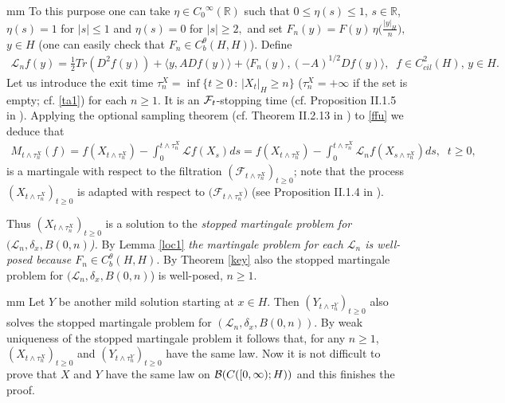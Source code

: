 \documentclass[preprint]{imsart}
\def\R{\mathbb R}
\def\L{\mathcal L}
\begin{document}
 mm 
 To this purpose one can take $\eta \in {C_0}^{\infty}(\R)$ such that $0 \le \eta(s) \le 1$, $s \in \R$,  $\eta(s)=1$ for $|s| \le 1$ and  $\eta(s) =0 $ for $|s|\ge 2,$ and set 
$
F_n(y) = F(y)\,  \eta \big(\frac{ |y|_H}{n}\big), $ $ y \in H
$ (one can easily  check that $F_n \in C_b^{\theta} (H,H) $).
Define  
$$ 
 \begin{array}{l}
\L_n f (y) = \frac{1}{2} Tr(D^2 f(y)) + \langle y, A Df(y) \rangle +
\langle F_n (y),  (-A)^{1/2} Df(y) \rangle, \;\; f \in C^2_{cil}(H), \, y \in H.
\end{array}  
$$   
Let us introduce the exit time   $\tau_n^X = \inf \{ t \ge 0 \, : \, |X_t|_H \ge n \}$ ($\tau_n^X = + \infty$ if the set is empty; cf. \eqref{ta1}) for each $n \ge 1$.
 It is an ${\cal F}_t$-stopping time (cf. Proposition II.1.5 in \cite{EK}).
Applying  the optional sampling theorem (cf. Theorem II.2.13 in \cite{EK})  to \eqref{ffu} we deduce  that   
\begin{gather*}
M_{t \wedge \tau_n^X}(f)=  f( X_{t \wedge \tau_n^X}) - \int_0^{t \wedge \tau_n^X} \L f(X_s)ds
= f(X_{t \wedge \tau_n^X}) - \int_0^{t \wedge \tau_n^X} \L_n f(X_{s   \wedge \tau_n^X})ds, \;\; t\ge 0,
\end{gather*}
 is a  martingale with respect to the filtration $({\mathcal F}_{t \wedge \tau_n^X})_{t \ge 0}$; note that the process $(X_{t \wedge \tau_n^X})_{t \ge 0}$ is adapted with respect to $\big ( {\mathcal F}_{t \wedge \tau_n^X} \big )$ (see Proposition II.1.4 in \cite{EK}). 
  
 
Thus  $(X_{ t\wedge \tau_n^X  })_{t \ge 0} $ is a solution to  the  {\sl stopped martingale problem for $(\L_n, \delta_x, B(0,n)$).}
 By Lemma \ref{loc1}   {\sl the martingale problem for each $\L_n$ is well-posed because $F_n \in C_b^{\theta}(H,H)$}.   By Theorem \ref{key}  also the   stopped martingale problem for   $(\L_n, \delta_x, B(0,n)$) is well-posed, $n \ge 1$. 
 
{} mm
Let  $Y$ be another  mild solution starting at $x \in H$. Then $(Y_{ t\wedge \tau_n^Y  })_{t \ge 0} $ also solves the stopped martingale problem for $(\L_n, \delta_x, B(0,n))$. 
  By weak uniqueness of the stopped martingale problem it follows that, for any $n \ge 1$,  $(X_{ t\wedge \tau_n^X  })_{t \ge 0} $ and $(Y_{ t\wedge \tau_n^Y  })_{t \ge 0} $ have the same law. Now it is not difficult to prove that  $X$ and $Y$ have the same law on ${\cal B}(C([0,\infty);  H))$ and this finishes the proof.   
\end{document}

